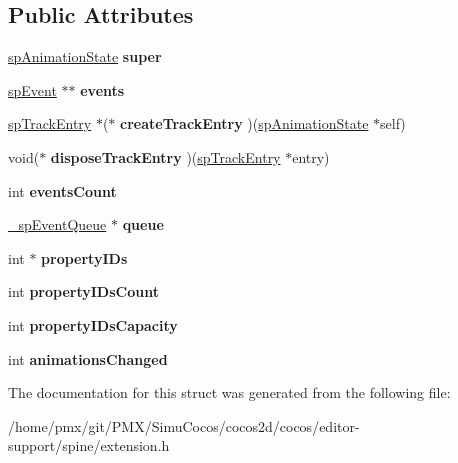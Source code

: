 \subsection*{Public Attributes}
\begin{DoxyCompactItemize}
\item 
\mbox{\label{struct__spAnimationState_a9c040d3d830e3e22b273f772493b3de8}} 
\hyperlink{structspAnimationState}{sp\+Animation\+State} {\bfseries super}
\item 
\mbox{\label{struct__spAnimationState_a11cfcad46ebd318dbf3444c336e57478}} 
\hyperlink{structspEvent}{sp\+Event} $\ast$$\ast$ {\bfseries events}
\item 
\mbox{\label{struct__spAnimationState_aeb6d24af917a46ee51b139efae008455}} 
\hyperlink{structspTrackEntry}{sp\+Track\+Entry} $\ast$($\ast$ {\bfseries create\+Track\+Entry} )(\hyperlink{structspAnimationState}{sp\+Animation\+State} $\ast$self)
\item 
\mbox{\label{struct__spAnimationState_a2b531b9801f2ea3b8678821d56f210c7}} 
void($\ast$ {\bfseries dispose\+Track\+Entry} )(\hyperlink{structspTrackEntry}{sp\+Track\+Entry} $\ast$entry)
\item 
\mbox{\label{struct__spAnimationState_a4435e6c02c89933a0017290925311494}} 
int {\bfseries events\+Count}
\item 
\mbox{\label{struct__spAnimationState_a0b981f367006e9e7a4ab450755e1610c}} 
\hyperlink{struct__spEventQueue}{\+\_\+sp\+Event\+Queue} $\ast$ {\bfseries queue}
\item 
\mbox{\label{struct__spAnimationState_a9f02801f34272f5b9f58104bd6ce7e19}} 
int $\ast$ {\bfseries property\+I\+Ds}
\item 
\mbox{\label{struct__spAnimationState_a73af65371818d7507db2d52420cf22f9}} 
int {\bfseries property\+I\+Ds\+Count}
\item 
\mbox{\label{struct__spAnimationState_a65fd79b6234db5085ba14407a7eb3fea}} 
int {\bfseries property\+I\+Ds\+Capacity}
\item 
\mbox{\label{struct__spAnimationState_ad1f1833fea938abf38032f44ad8a1b6e}} 
int {\bfseries animations\+Changed}
\end{DoxyCompactItemize}


The documentation for this struct was generated from the following file\+:\begin{DoxyCompactItemize}
\item 
/home/pmx/git/\+P\+M\+X/\+Simu\+Cocos/cocos2d/cocos/editor-\/support/spine/extension.\+h\end{DoxyCompactItemize}

